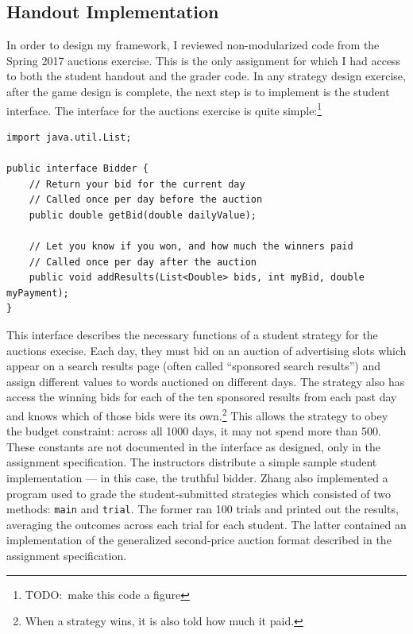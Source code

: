 \documentclass[pageno]{jpaper}
\begin{document}
\subsection*{Handout Implementation}
In order to design my framework, I reviewed non-modularized code from the Spring 2017 auctions exercise.
This is the only assignment for which I had access to both the student handout and the grader code.
In any strategy design exercise, after the game design is complete, the next step is to implement is the student interface.
The interface for the auctions exercise is quite simple:\footnote{TODO:\ make this code a figure}
\begin{verbatim}
import java.util.List;

public interface Bidder {
    // Return your bid for the current day
    // Called once per day before the auction
    public double getBid(double dailyValue);

    // Let you know if you won, and how much the winners paid
    // Called once per day after the auction
    public void addResults(List<Double> bids, int myBid, double myPayment);
}
\end{verbatim}
This interface describes the necessary functions of a student strategy for the auctions execise.
Each day, they must bid on an auction of advertising slots which appear on a search results page (often called ``sponsored search results'') and assign different values to words auctioned on different days.
The strategy also has access the winning bids for each of the ten sponsored results from each past day and knows which of those bids were its own.\footnote{When a strategy wins, it is also told how much it paid.}
This allows the strategy to obey the budget constraint: across all 1000 days, it may not spend more than 500.
These constants are not documented in the interface as designed, only in the assignment specification.
The instructors distribute a simple sample student implementation --- in this case, the truthful bidder.
Zhang also implemented a program used to grade the student-submitted strategies which consisted of two methods: \texttt{main} and \texttt{trial}.
The former ran 100 trials and printed out the results, averaging the outcomes across each trial for each student.
The latter contained an implementation of the generalized second-price auction format described in the assignment specification.
\end{document}
